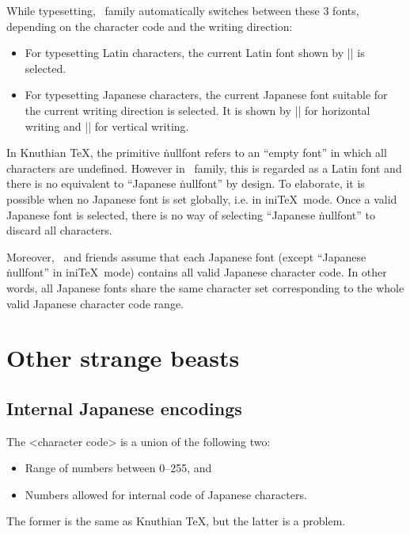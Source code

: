 \documentclass[a4paper,11pt,dvipdfmx]{article}
\let\emph=\origemph
\begin{document}
While typesetting, \pTeX\ family automatically switches between
these 3 fonts, depending on the character code and the writing direction:
\begin{itemize}
  \item For typesetting Latin characters,
    the current Latin font shown by |\the\font| is selected.
  \item For typesetting Japanese characters,
    the current Japanese font suitable for the current writing direction
    is selected. It is shown by |\the\jfont| for horizontal writing
    and |\the\tfont| for vertical writing.
\end{itemize}

In Knuthian \TeX, the primitive \.{nullfont} refers to an ``empty font''
in which all characters are undefined.
However in \pTeX\ family, this is regarded as a Latin font
and there is no equivalent to ``Japanese \.{nullfont}'' by design.
To elaborate, it is possible \emph{only} when no Japanese font is
set globally, i.e. in ini\TeX\ mode.
Once a valid Japanese font is selected, there is no way of
selecting ``Japanese \.{nullfont}'' to discard all characters.

Moreover, \pTeX\ and friends assume that each Japanese font
(except ``Japanese \.{nullfont}'' in ini\TeX\ mode)
contains all valid Japanese character code.
In other words, all Japanese fonts share the same character set
corresponding to the whole valid Japanese character code range.\label{jfont}

\section{Other strange beasts}


\subsection{Internal Japanese encodings}\label{kanji-internal}

The <character code> is a union of the following two:
\begin{itemize}
 \item Range of numbers between 0--255, and
 \item Numbers allowed for internal code of Japanese characters.
\end{itemize}
The former is the same as Knuthian \TeX, but the latter is a problem.
\end{document}
